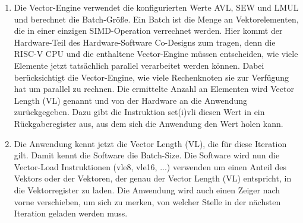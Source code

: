 \begin{enumerate}
    \item Die Vector-Engine verwendet die konfigurierten Werte \gls{AVL}, \gls{SEW} und \gls{LMUL} und berechnet die Batch-Größe. Ein Batch ist die Menge an Vektorelementen, die in einer einzigen SIMD-Operation verrechnet werden. Hier kommt der Hardware-Teil des Hardware-Software Co-Designs zum tragen, denn die RISC-V CPU und die enthaltene Vector-Engine müssen entscheiden, wie viele Elemente jetzt tatsächlich parallel verarbeitet werden können. Dabei berücksichtigt die Vector-Engine, wie viele Rechenknoten sie zur Verfügung hat um parallel zu rechnen. Die ermittelte Anzahl an Elementen wird Vector Length (VL) genannt und von der Hardware an die Anwendung zurückgegeben. Dazu gibt die Instruktion set(i)vli diesen Wert in ein Rückgaberegister aus, aus dem sich die Anwendung den Wert holen kann.


    \item Die Anwendung kennt jetzt die Vector Length (VL), die für diese Iteration gilt. Damit kennt die Software die Batch-Size. Die Software wird nun die Vector-Load Instruktionen (vle8, vle16, ...) verwenden um einen Anteil des Vektors oder der Vektoren, der genau der Vector Length (VL) entspricht, in die Vektorregister zu laden. Die Anwendung wird auch einen Zeiger nach vorne verschieben, um sich zu merken, von welcher Stelle in der nächsten Iteration geladen werden muss.



\end{enumerate}
